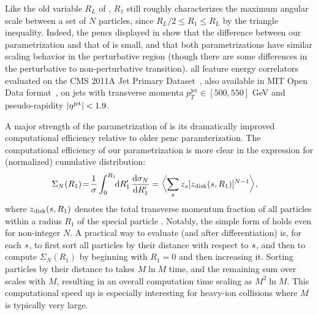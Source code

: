 \indent
Like the old variable \(R_L\) of , \(R_1\) still roughly characterizes the maximum angular scale between a set of \(N\) particles, since \(R_L/2 \leq R_1 \leq R_L\) by the triangle inequality.
%
Indeed, the \glspl{penc} displayed in  show that the difference between our parametrization and that of  is small, and that both parametrizations have similar scaling behavior in the perturbative region (though there are some differences in the perturbative to non-perturbative transition).
%
 all feature energy correlators evaluated on the CMS 2011A Jet Primary Dataset~\cite{CERNOpenDataPortal, CMS:JetPrimary2011A}, also available in MIT Open Data format~\cite{Komiske:2019jim, komiske_patrick_2019_3340205}, on jets with transverse momenta $p_{T}^{\text{jet}} \in [500, 550]$ GeV and pseudo-rapidity $\vert \eta^{\rm jet} \vert < 1.9$.

\indent
A major strength of the parametrization of  is its dramatically improved computational efficiency relative to older \gls{penc} paramterization.
%
The computational efficiency of our parametrization is more clear in the expression for (normalized) cumulative distribution:
\begin{align} \label{eq:new_cml}
  \Sigma_N(R_1)
  \!
  &=
  \!
  \frac{1}{\sigma}
  \int_0^{R_1}
  \!\!
  \dd R_1'
  \,
  \frac{\dd \sigma_N}{\dd R_1'}
  =
  \biggl\langle \sum_{\izero} z_{\izero} [z_{\rm disk}(\izero,R_1)]^{N-1}
  \biggr\rangle
  ,
\end{align}
where $z_{\rm disk}(\izero,R_1)$ denotes the total transverse momentum fraction of all particles within a radius $R_1$ of the special particle \izero{}.
%
Notably, the simple form of  holds even for non-integer $N$.
%
A practical way to evaluate  (and  after differentiation) is, for each $\izero$, to first sort all particles by their distance with respect to $\izero$, and then to compute $\Sigma_N(R_1)$ by beginning with $R_1=0$ and then increasing it.
%
Sorting particles by their distance to \izero{} takes $M\ln M$ time, and the remaining sum over \izero{} scales with $M$, resulting in an overall computation time scaling as $M^2 \ln M$.
%
This computational speed up is especially interesting for heavy-ion collisions where $M$ is typically very large.


